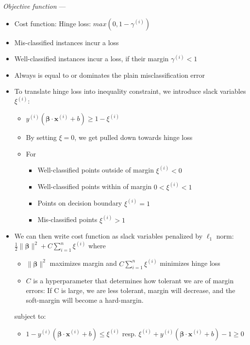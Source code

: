 \emph{Objective function} --- 
\begin{itemize}
    \item Cost function: Hinge loss: $max(0,1-\gamma^{(i)})$
    \item Mis-classified instances incur a loss
    \item Well-classified instances incur a loss, if their margin $\gamma^{(i)} < 1$
    \item Always is equal to or dominates the plain misclassification error
    \item To translate hinge loss into inequality constraint, we introduce slack variables $\xi^{(i)}$:
    \begin{itemize}
        \item $y^{(i)} (\boldsymbol{\beta} \cdot \boldsymbol{x}^{(i)} + b) \geq 1 - \xi^{(i)}$
        \item By setting $\xi = 0$, we get pulled down towards hinge loss
        \item For
        \begin{itemize}
            \item Well-classified points outside of margin $\xi^{(i)} < 0$
            \item Well-classified points within of margin $0 < \xi^{(i)} < 1$
            \item Points on decision boundary $\xi^{(i)} = 1$
            \item Mis-classified points $\xi^{(i)} > 1$
        \end{itemize}
    \end{itemize}
    \item We can then write cost function as slack variables penalized by $\ell_1$ norm: $\frac{1}{2} \| \boldsymbol{\beta} \|^2 + C \sum_{i=1}^n \xi^{(i)}$ where 
    \begin{itemize}
        \item $\| \boldsymbol{\beta} \|^2$ maximizes margin and $C \sum_{i=1}^n \xi^{(i)}$ minimizes hinge loss
        \item $C$ is a hyperparameter that determines how tolerant we are of margin errors: If C is large, we are less tolerant, margin will decrease, and the soft-margin will become a hard-margin.
    \end{itemize}
    subject to:
    \begin{itemize}
        \item $1 - y^{(i)} (\boldsymbol{\beta} \cdot \boldsymbol{x}^{(i)} + b) \leq \xi^{(i)}$ resp. $\xi^{(i)} + y^{(i)} (\boldsymbol{\beta} \cdot \boldsymbol{x}^{(i)} + b) - 1 \geq 0$ 

\end{itemize}
\end{itemize}
